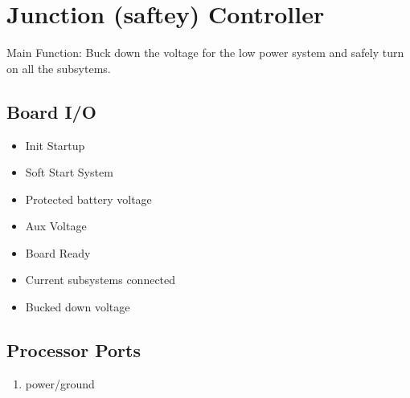 \documentclass[letterpaper,12pt]{article}
\begin{document}
\pagebreak
\section{Junction (saftey) Controller}
   Main Function: Buck down the voltage for the low power system and safely turn on all the subsytems.
   \subsection{Board I/O}
   \begin{multicols}{2}
   
   \begin{itemize}
      \item Init Startup
      \item Soft Start System
   \end{itemize}
   
   \begin{itemize}
      \item Protected battery voltage
      \item Aux Voltage
   \end{itemize}
   
   \columnbreak
   

   \begin{itemize}
      \item Board Ready
      \item Current subsystems connected
   \end{itemize}
   
   \begin{itemize}
      \item Bucked down voltage 
   \end{itemize}
   \end{multicols}

   \subsection{Processor Ports}
   \begin{multicols}{2}
   \begin{enumerate}[(a.)]
      \item power/ground
      
   \end{enumerate}
   \end{multicols}
\end{document}
